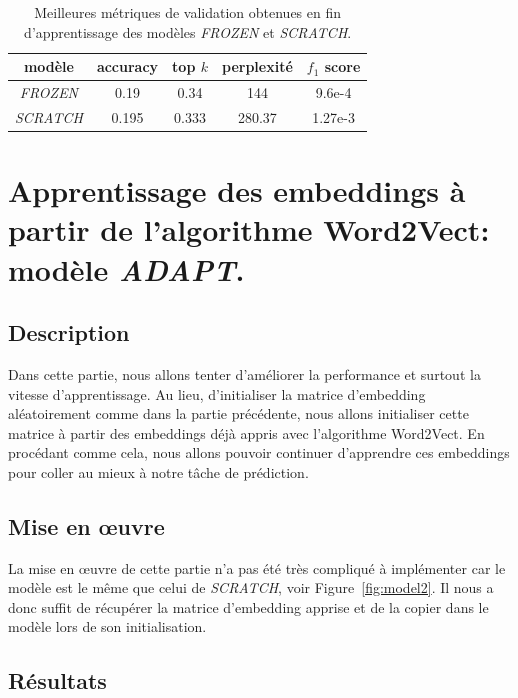 \documentclass[a4paper]{article}
\begin{document}
\begin{table}
    \centering
    \begin{tabular}{|c|c|c|c|c|}
        \hline
        modèle & accuracy  & top $k$  & perplexité  & $f_1$ score \\
        \hline
        \textit{FROZEN} & 0.19 & 0.34  & 144 & 9.6e-4 \\
        \hline
        \textit{SCRATCH} & 0.195 & 0.333  & 280.37 & 1.27e-3 \\
        \hline
    \end{tabular}
    \caption{Meilleures métriques de validation obtenues en fin d'apprentissage des modèles \textit{FROZEN} et \textit{SCRATCH}.}
    \label{tab:metriques model2}
\end{table}


\section{Apprentissage des embeddings à partir de l'algorithme Word2Vect: modèle \textit{ADAPT}.}

\subsection{Description}

Dans cette partie, nous allons tenter d'améliorer la performance et surtout la vitesse d'apprentissage. Au lieu,
d'initialiser la matrice d'embedding aléatoirement comme dans la partie précédente, nous allons initialiser cette 
matrice à partir des embeddings déjà appris avec l'algorithme Word2Vect. En procédant comme cela, nous allons pouvoir
continuer d'apprendre ces embeddings pour coller au mieux à notre tâche de prédiction.

\subsection{Mise en \oe uvre}

La mise en \oe uvre de cette partie n'a pas été très compliqué à implémenter car le modèle est le même que celui de 
\textit{SCRATCH}, voir Figure~\ref{fig:model2}. Il nous a donc suffit de récupérer la matrice d'embedding apprise et de 
la copier dans le modèle lors de son initialisation.

\subsection{Résultats}
\end{document}
